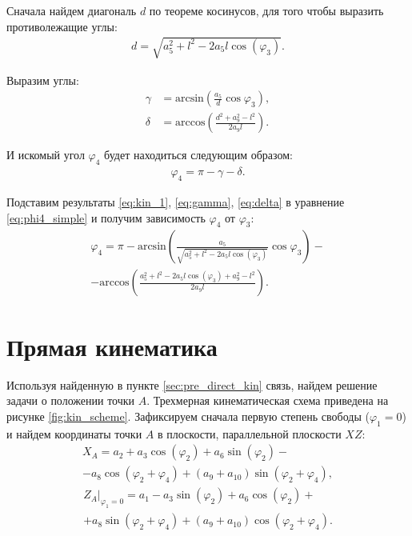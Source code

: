 Сначала найдем диагональ $d$ по теореме косинусов, для того чтобы выразить противолежащие углы:
\begin{align}
    d = \sqrt{a_5^2 + l^2 - 2a_5 l \cos(\varphi_3)}. \label{eq:kin_1}
\end{align}

\noindent Выразим углы:
\begin{align}
    \gamma &= \text{arcsin}\left(\frac{a_5}{d}\cos \varphi_3\right) \label{eq:gamma}, \\
    \delta &= \text{arccos}\left(\frac{d^2+a_9^2-l^2}{2 a_9 l}\right). \label{eq:delta}
\end{align}

\noindent И искомый угол $ \varphi_4 $ будет находиться следующим образом:
\begin{align}
    \varphi_4 = \pi - \gamma - \delta. \label{eq:phi4_simple}
\end{align}

\noindent Подставим результаты \ref{eq:kin_1}, \ref{eq:gamma}, \ref{eq:delta} в уравнение \ref{eq:phi4_simple} и получим зависимость $ \varphi_4 $ от $ \varphi_3 $:
\begin{multline}
    \varphi_4 = \pi - \text{arcsin}\left(\frac{a_5}{\sqrt{a_5^2 + l^2 - 2a_5 l \cos(\varphi_3)}}\cos \varphi_3\right) - \\ - \text{arccos}\left(\frac{a_5^2 + l^2 - 2a_5 l \cos(\varphi_3)+a_9^2-l^2}{2 a_9 l}\right) .
\end{multline}

\section{Прямая кинематика}\label{sec:direct_kinematics}
Используя найденную в пункте \ref{sec:pre_direct_kin} связь, найдем решение задачи о положении точки $ A $. Трехмерная кинематическая схема приведена на рисунке \ref{fig:kin_scheme}. Зафиксируем сначала первую степень свободы ($ \varphi_1 = 0 $) и найдем координаты точки $ A $ в плоскости, параллельной плоскости $ XZ $:
\begin{multline}
    X_A=a_2+a_3\cos(\varphi_2)+a_6\sin(\varphi_2)-\\-a_8 \cos(\varphi _2+\varphi _4)+(a_9+a_{10}) \sin(\varphi _2+\varphi _4) ,
\end{multline}
\begin{multline} %
    Z_A\Bigr|_{\varphi_1=0} =a_1-a_3 \sin(\varphi _2)+a_6 \cos(\varphi _2)+\\+a_8 \sin(\varphi _2+\varphi _4)+(a_9+a_{10}) \cos(\varphi _2+\varphi _4).
\end{multline}

